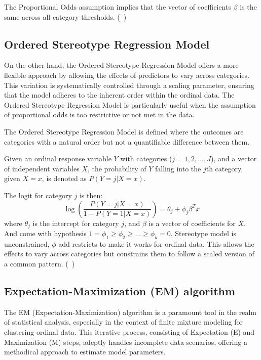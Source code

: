 \documentclass{article}
\begin{document}
The Proportional Odds assumption implies that the vector of coefficients $\beta$ is the same across all category thresholds. (~\cite{mccullagh1980regression})

\subsection{Ordered Stereotype Regression Model}

On the other hand, the Ordered Stereotype Regression Model offers a more flexible approach by allowing the effects of predictors to vary across categories. This variation is systematically controlled through a scaling parameter, ensuring that the model adheres to the inherent order within the ordinal data. The Ordered Stereotype Regression Model is particularly useful when the assumption of proportional odds is too restrictive or not met in the data.

The Ordered Stereotype Regression Model is defined where the outcomes are categories with a natural order but not a quantifiable difference between them.

Given an ordinal response variable $Y$ with categories ($j=1, 2, \ldots, J$), and a vector of independent variables $X$, the probability of $Y$ falling into the $j$th category, given $X = x$, is denoted as $P(Y = j | X = x)$.


The logit for category $j$ is then:
\[
\log\left(\frac{P(Y = j | X = x)}{1 - P(Y = 1 | X = x)}\right) = \theta_j + \phi_j \beta^T x
\]
where $\theta_j$ is the intercept for category $j$, and $\beta$ is a vector of coefficients for $X$.
And come with hypothesis
$1 = \phi_1 \geq \phi_2 \geq \ldots \geq \phi_k = 0.$
Stereotype model is unconstrained, $\phi$ add restricts to make it works for ordinal data.
This allows the effects to vary across categories but constrains them to follow a scaled version of a common pattern. (~\cite{anderson1984regression})



\subsection{Expectation-Maximization (EM) algorithm}

The EM (Expectation-Maximization) algorithm is a paramount tool in the realm of statistical analysis, especially in the context of finite mixture modeling for clustering ordinal data. This iterative process, consisting of Expectation (E) and Maximization (M) steps, adeptly handles incomplete data scenarios, offering a methodical approach to estimate model parameters.
\end{document}
